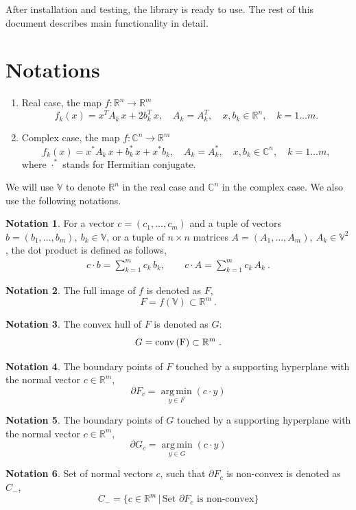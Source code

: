 \documentclass[a4paper]{article}
\DeclareMathOperator*{\argmin}{arg\,min}
\newcommand{\R}{\mathbb{R}}
\newcommand{\conv}{\rm{conv}\,}
\theoremstyle{definition}
\newtheorem{definition}{Notation}[]
\begin{document}
After installation and testing, the library is ready to use. The rest of this document describes main functionality in detail.

\newpage

\section*{Notations}
\begin{enumerate}
\item Real case, the map $f\colon \mathbb{R}^n\to\mathbb{R}^m$
\begin{equation}
f_k(x)=x^TA_k\, x+2b_k^T\,x ,\quad A_k=A_k^T ,\quad x, b_k\in \mathbb{R}^n ,\quad k=1\dots m . \label{real}
\end{equation}
\item Complex case, the map $f\colon \mathbb{C}^n\to\mathbb{R}^m$
\begin{equation}
f_k(x)=x^*A_k\, x+b_k^*\, x+x^*b_k ,\quad A_k=A_k^* ,\quad x, b_k\in \mathbb{C}^n ,\quad k=1\dots m ,\label{complex}
\end{equation}
where $\cdot^*$ stands for Hermitian conjugate.
\end{enumerate}

We will use $\mathbb{V}$ to denote $\mathbb{R}^n$ in the real case and $\mathbb{C}^n$ in the  complex case.
We also use the following notations.\\

\theoremstyle{definition}
\begin{definition}
For a vector $c=(c_1,...,c_m)$ and a tuple of vectors $b=(b_1,...,b_m), \ b_k \in \mathbb{V}$, or a tuple of $n\times n$ matrices $A=(A_1,...,A_m), \  A_k\in \mathbb{V}^2$, the dot product is defined as follows,
\begin{eqnarray}
c\cdot b=\sum\limits_{k=1}^m c_k\, b_k ,\qquad
c\cdot A=\sum\limits_{k=1}^m c_k\, A_k\ . \nonumber
\end{eqnarray}
\end{definition}

\begin{definition}
The full image of $f$ is denoted as $F$,
	$$F=f(\mathbb{V})\subset \mathbb{R}^m\ .$$
\end{definition}
\begin{definition} The convex hull of $F$ is denoted as $G$:
	$$G=\conv (F)\subset \mathbb{R}^m\ .$$
\end{definition}
\begin{definition} The boundary points of $F$ touched by a supporting hyperplane with the normal vector $c\in\mathbb{R}^m$,
	$$\partial F_c=\argmin\limits_{y\in F}(c\cdot y)$$
\end{definition}
\begin{definition} The boundary points of $G$ touched by a supporting hyperplane with the normal vector $c\in\mathbb{R}^m$,
	$$\partial G_c=\argmin\limits_{y\in G}(c\cdot y)$$
\end{definition}
\begin{definition}\label{ex:c_minus}
	Set of normal vectors $c$, such that $\partial F_c$ is non-convex is denoted as $C_-$,
	$$C_-=\{c\in\R^m\,\big|\,\mbox{Set }\partial F_c\mbox{ is non-convex}\}$$
\end{definition}
\end{document}
